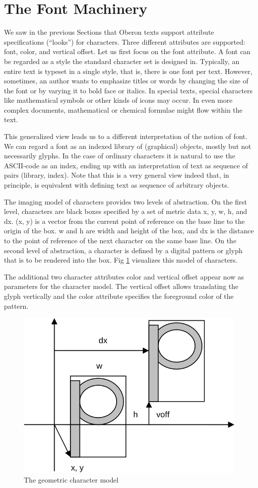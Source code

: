 \section{The Font Machinery}
\label{sec:fontmachinery}
We saw in the previous Sections that Oberon texts support attribute specifications (“looks”) for
characters. Three different attributes are supported: font, color, and vertical offset. Let us first focus
on the font attribute. A font can be regarded as a style the standard character set is designed in.
Typically, an entire text is typeset in a single style, that is, there is one font per text. However,
sometimes, an author wants to emphasize titles or words by changing the size of the font or by
varying it to bold face or italics. In special texts, special characters like mathematical symbols or
other kinds of icons may occur. In even more complex documents, mathematical or chemical
formulae might flow within the text.

This generalized view leads us to a different interpretation of the notion of font. We can regard a
font as an indexed library of (graphical) objects, mostly but not necessarily glyphs. In the case of
ordinary characters it is natural to use the ASCII-code as an index, ending up with an interpretation
of text as sequence of pairs (library, index). Note that this is a very general view indeed that, in
principle, is equivalent with defining text as sequence of arbitrary objects.

The imaging model of characters provides two levels of abstraction. On the first level, characters
are black boxes specified by a set of metric data x, y, w, h, and dx. (x, y) is a vector from the current
point of reference on the base line to the origin of the box. w and h are width and height of the box,
and dx is the distance to the point of reference of the next character on the same base line. On the
second level of abstraction, a character is defined by a digital pattern or glyph that is to be rendered
into the box. Fig \ref{fig:character} visualizes this model of characters.

The additional two character attributes color and vertical offset appear now as parameters for the
character model. The vertical offset allows translating the glyph vertically and the color attribute
specifies the foreground color of the pattern.
\begin{figure}
  \label{fig:character}
  \centering
  \includegraphics[width=.7\textwidth]{i/i}
  \caption{The geometric character model}
\end{figure}

